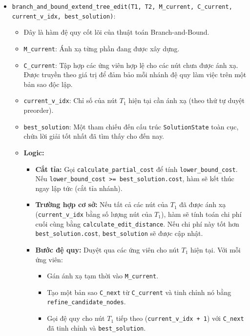 \documentclass{article}
\begin{document}
\begin{itemize}
\begin{itemize}
\begin{itemize}
            \end{itemize}
        \item \texttt{branch\_and\_bound\_extend\_tree\_edit(T1, T2, M\_current, C\_current, current\_v\_idx, best\_solution)}:
            \begin{itemize}
                \item Đây là hàm đệ quy cốt lõi của thuật toán Branch-and-Bound.
                \item \texttt{M\_current}: Ánh xạ từng phần đang được xây dựng.
                \item \texttt{C\_current}: Tập hợp các ứng viên hợp lệ cho các nút chưa được ánh xạ. Được truyền theo giá trị để đảm bảo mỗi nhánh đệ quy làm việc trên một bản sao độc lập.
                \item \texttt{current\_v\_idx}: Chỉ số của nút $T_1$ hiện tại cần ánh xạ (theo thứ tự duyệt preorder).
                \item \texttt{best\_solution}: Một tham chiếu đến cấu trúc \texttt{SolutionState} toàn cục, chứa lời giải tốt nhất đã tìm thấy cho đến nay.
                \item \textbf{Logic:}
                    \begin{itemize}
                        \item \textbf{Cắt tỉa:} Gọi \texttt{calculate\_partial\_cost} để tính \texttt{lower\_bound\_cost}. Nếu \texttt{lower\_bound\_cost >= best\_solution.cost}, hàm sẽ kết thúc ngay lập tức (cắt tỉa nhánh).
                        \item \textbf{Trường hợp cơ sở:} Nếu tất cả các nút của $T_1$ đã được ánh xạ (\texttt{current\_v\_idx} bằng số lượng nút của $T_1$), hàm sẽ tính toán chi phí cuối cùng bằng \texttt{calculate\_edit\_distance}. Nếu chi phí này tốt hơn \texttt{best\_solution.cost}, \texttt{best\_solution} sẽ được cập nhật.
                        \item \textbf{Bước đệ quy:} Duyệt qua các ứng viên cho nút $T_1$ hiện tại. Với mỗi ứng viên:
                            \begin{itemize}
                                \item Gán ánh xạ tạm thời vào \texttt{M\_current}.
                                \item Tạo một bản sao \texttt{C\_next} từ \texttt{C\_current} và tinh chỉnh nó bằng \texttt{refine\_candidate\_nodes}.
                                \item Gọi đệ quy cho nút $T_1$ tiếp theo (\texttt{current\_v\_idx + 1}) với \texttt{C\_next} đã tinh chỉnh và \texttt{best\_solution}.

\end{itemize}
\end{itemize}
\end{itemize}
\end{itemize}
\end{itemize}
\end{document}
